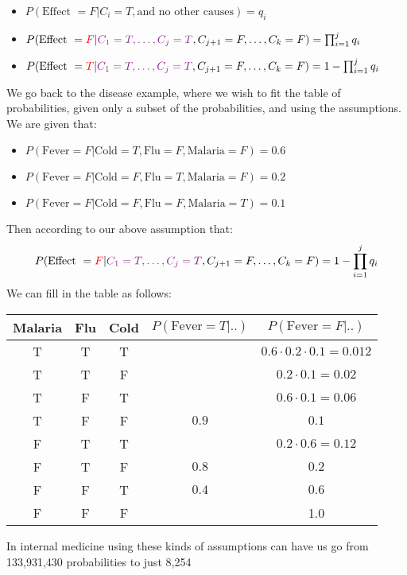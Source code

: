 \documentclass{article}
\def\blu#1{{\color{blu}#1}}
\def\red#1{{\color{red}#1}}
\begin{document}
\begin{itemize}
	\item $ P(\text{Effect }= F | C_i = T, \text{and no other causes}) = q_i$
	\item $ P(\text{Effect }= \red{F} | {\color{Fuchsia}C_1 = T, \dots, C_j = T}, C_{j+1} = F, \dots, C_k = F) = \prod_{i = 1}^{j}q_i$
	\item $ P(\text{Effect }= \red{T} | {\color{Fuchsia}C_1 = T, \dots, C_j = T}, C_{j+1} = F, \dots, C_k = F) = 1 -  \prod_{i = 1}^{j}q_i$
\end{itemize}
\begin{siderules}
	We go back to the disease example, where we wish to fit the table of probabilities, given only a subset of the probabilities, and using the assumptions. We are given that:
	\begin{itemize}
		\item $ P(\text{Fever} = F | \text{Cold} = T, \text{Flu} = F, \text{Malaria} = F) = 0.6 $
		\item $ P(\text{Fever} = F | \text{Cold} = F, \text{Flu} = T, \text{Malaria} = F) = 0.2 $
		\item $ P(\text{Fever} = F | \text{Cold} = F, \text{Flu} = F, \text{Malaria} = T) = 0.1 $
	\end{itemize}
Then according to our above assumption that:
\begin{align*}
P(\text{Effect }= \red{F} | {\color{Fuchsia}C_1 = T, \dots, C_j = T}, C_{j+1} = F, \dots, C_k = F) = 1 -  \prod_{i = 1}^{j}q_i
\end{align*}
We can fill in the table as follows:
\begin{center}
	\begin{tabular}{|c|c|c|c|c|}
		\hline
		Malaria & Flu & Cold & $ P(\text{Fever}=T | ..) $ & $ P(\text{Fever}=F|..) $ \\
		\hline
		T & T & T& & $ 0.6 \cdot 0.2 \cdot 0.1 = 0.012 $  \\
		\hline
		T & T & F & & $ 0.2 \cdot 0.1 = 0.02 $ \\
		\hline
		T & F & T& & $ 0.6 \cdot 0.1 = 0.06 $ \\
		\hline
		T & F & F & \blu{$ 0.9 $} & \blu{$ 0.1 $} \\
		\hline
		F & T & T & & $ 0.2 \cdot 0.6 = 0.12 $ \\
		\hline
		F & T & F & \blu{$ 0.8 $} & \blu{$ 0.2$} \\
		\hline
		F & F & T & \blu{$ 0.4 $} & \blu{$ 0.6 $} \\
		\hline
		F & F & F & & 1.0\\
		\hline
	\end{tabular}
\end{center}
In internal medicine using these kinds of assumptions can have us go from 133,931,430 probabilities to just 8,254
\end{siderules}
\end{document}
